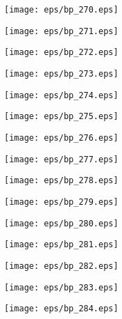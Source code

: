 \documentclass{book}
\begin{document}
	\clearpage\begin{figure}[p]
    \centering
	\texttt{[image: eps/bp\_270.eps]}
	\end{figure}
	\clearpage\begin{figure}[p]
    \centering
	\texttt{[image: eps/bp\_271.eps]}
	\end{figure}
	\clearpage\begin{figure}[p]
    \centering
	\texttt{[image: eps/bp\_272.eps]}
	\end{figure}
	\clearpage\begin{figure}[p]
    \centering
	\texttt{[image: eps/bp\_273.eps]}
	\end{figure}
	\clearpage\begin{figure}[p]
    \centering
	\texttt{[image: eps/bp\_274.eps]}
	\end{figure}
	\clearpage\begin{figure}[p]
    \centering
	\texttt{[image: eps/bp\_275.eps]}
	\end{figure}
	\clearpage\begin{figure}[p]
    \centering
	\texttt{[image: eps/bp\_276.eps]}
	\end{figure}
	\clearpage\begin{figure}[p]
    \centering
	\texttt{[image: eps/bp\_277.eps]}
	\end{figure}
	\clearpage\begin{figure}[p]
    \centering
	\texttt{[image: eps/bp\_278.eps]}
	\end{figure}
	\clearpage\begin{figure}[p]
    \centering
	\texttt{[image: eps/bp\_279.eps]}
	\end{figure}
	\clearpage\begin{figure}[p]
    \centering
	\texttt{[image: eps/bp\_280.eps]}
	\end{figure}
	\clearpage\begin{figure}[p]
    \centering
	\texttt{[image: eps/bp\_281.eps]}
	\end{figure}
	\clearpage\begin{figure}[p]
    \centering
	\texttt{[image: eps/bp\_282.eps]}
	\end{figure}
	\clearpage\begin{figure}[p]
    \centering
	\texttt{[image: eps/bp\_283.eps]}
	\end{figure}
	\clearpage\begin{figure}[p]
    \centering
	\texttt{[image: eps/bp\_284.eps]}
	\end{figure}
\end{document}
